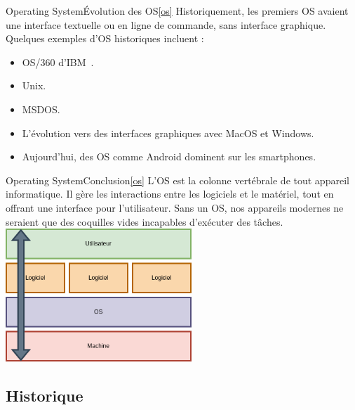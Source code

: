 \documentclass{beamer}
\begin{document}
    \begin{frame}{Operating System}{Évolution des OS\cref{os}}
        Historiquement, les premiers OS avaient une interface textuelle ou en ligne de commande, sans interface graphique.
        Quelques exemples d'OS historiques incluent :
        \begin{itemize}
            \item OS/360 d'IBM~.
            \item Unix.
            \item MSDOS.
            \item L'évolution vers des interfaces graphiques avec MacOS et Windows.
            \item Aujourd'hui, des OS comme Android dominent sur les smartphones.
        \end{itemize}
    \end{frame}

    \begin{frame}{Operating System}{Conclusion\cref{os}}
        L'OS est la colonne vertébrale de tout appareil informatique.
        Il gère les interactions entre les logiciels et le matériel, tout en offrant une interface pour l'utilisateur.
        Sans un OS, nos appareils modernes ne seraient que des coquilles vides incapables d'exécuter des tâches.
        \bigbreak
        \centering
        \includegraphics[width=7cm]{image/os.drawio}
    \end{frame}

    \subsection{Historique}\label{subsec:historique}
\end{document}
